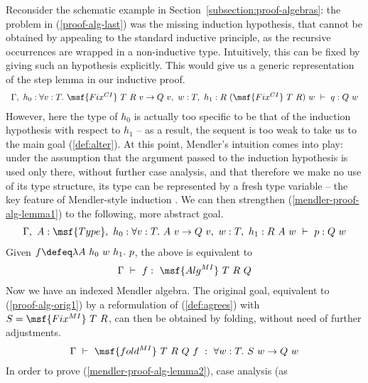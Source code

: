 \documentclass[submission,copyright,creativecommons]{eptcs}
\begin{document}
Reconsider the schematic example in
Section~\ref{subsection:proof-algebras}: the problem in
(\ref{proof-alg-last}) was the missing induction hypothesis, that
cannot be obtained by appealing to the standard inductive principle,
as the recursive occurrences are wrapped in a non-inductive
type. Intuitively, this can be fixed by giving such an hypothesis
explicitly. This would give us a generic representation of the step
lemma in our inductive proof.
\begin{gather}  \label{mendler-proof-alg-lemma1}
\begin{array}{lll}
\Gamma, \  h_0 : \forall v:T. \ \msf{Fix^{CI}} \ T \ R \ v \to Q
\ v, \
w: T, \ h_1: R \ (\msf{Fix^{CI}} \ T \ R) \ w \ \vdash \ q: Q \ w
\end{array}
 \end{gather} 
However, here the type of $h_0$ is actually too specific to be that of
the induction hypothesis with respect to $h_1$ -- as a result, the
sequent is too weak to take us to the main goal (\ref{def:alter}). At
this point, Mendler's intuition comes into play: under the assumption
that the argument passed to the induction hypothesis is used only
there, without further case analysis, and that therefore we make no
use of its type structure, its type can be represented by a fresh type
variable -- the key feature of Mendler-style induction
\cite{Mendler91,AbelMU05}. We can then strengthen
(\ref{mendler-proof-alg-lemma1}) to the following, more abstract goal.
\begin{gather}  \label{mendler-proof-alg-lemma2}
\begin{array}{lll} 
\Gamma, \ A: \msf{Type}, \ h_0 : \forall v:T. \ A \ v \to Q \ v, \ 
w: T, \ h_1: R \ A \ w \ \vdash \ p: Q \ w
\end{array}
 \end{gather} 
Given $f \defeq \lambda A \ h_0 \ w \ h_1. \ p $, the above is
equivalent to
\begin{gather}  \label{def:mendler-alg}
\Gamma \ \vdash \ f: \ \msf{Alg^{MI}} \ T \ R \ Q  \end{gather} 
Now we have an indexed Mendler algebra. The original goal, equivalent
to (\ref{proof-alg-orig1}) by a reformulation of (\ref{def:agrees})
with $S = \msf{Fix^{MI}} \ T \ R$, can then be obtained by folding,
without need of further adjustments.
\begin{gather}  \Gamma \ \vdash \ \msf{fold^{MI}} \ T \ R \ Q \ f \ : \ \forall
w:T. \ S \ w \to Q \ w \end{gather}
In order to prove (\ref{mendler-proof-alg-lemma2}), case analysis (as
\end{document}
